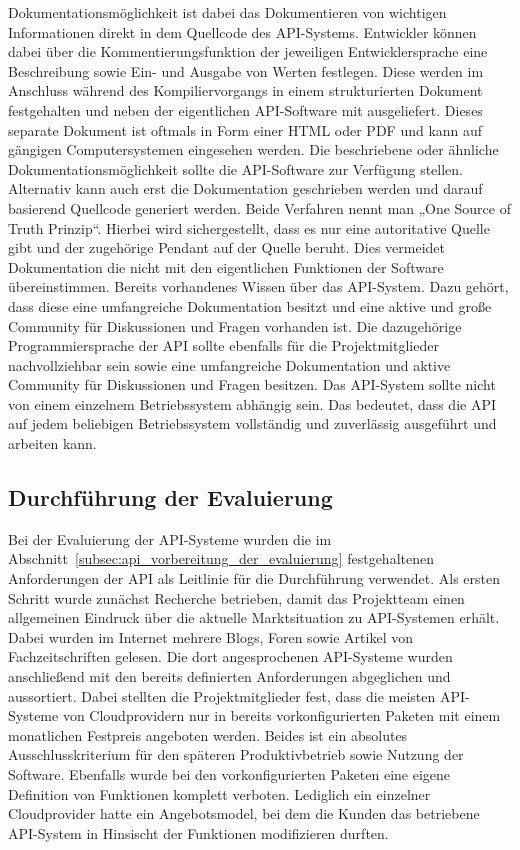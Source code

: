 \begin{outline}
  Dokumentationsmöglichkeit ist dabei das Dokumentieren von wichtigen
  Informationen direkt in dem Quellcode des \gls{API}\hyp{}Systems. Entwickler
  können dabei über die Kommentierungsfunktion der jeweiligen Entwicklersprache
  eine Beschreibung sowie Ein- und Ausgabe von Werten festlegen. Diese werden
  im Anschluss während des Kompiliervorgangs in einem strukturierten Dokument
  festgehalten und neben der eigentlichen \gls{API}\hyp{}Software mit
  ausgeliefert. Dieses separate Dokument ist oftmals in Form einer HTML oder
  PDF und kann auf gängigen Computersystemen eingesehen werden. Die
  beschriebene oder ähnliche Dokumentationsmöglichkeit sollte die
  \gls{API}\hyp{}Software zur Verfügung stellen. Alternativ kann auch erst die
  Dokumentation geschrieben werden und darauf basierend Quellcode generiert
  werden. Beide Verfahren nennt man „One Source of Truth Prinzip“. Hierbei wird
  sichergestellt, dass es nur eine autoritative Quelle gibt und der zugehörige
  Pendant auf der Quelle beruht. Dies vermeidet Dokumentation die nicht mit den
  eigentlichen Funktionen der Software übereinstimmen.
  \1 Bereits vorhandenes Wissen über das \gls{API}\hyp{}System. Dazu gehört,
  dass diese eine umfangreiche Dokumentation besitzt und eine aktive und große
  Community für Diskussionen und Fragen vorhanden ist. Die dazugehörige
  Programmiersprache der \gls{API} sollte ebenfalls für die Projektmitglieder
  nachvollziehbar sein sowie eine umfangreiche Dokumentation und aktive
  Community für Diskussionen und Fragen besitzen.
  \1 Das \gls{API}\hyp{}System sollte nicht von einem einzelnem Betriebssystem
  abhängig sein. Das bedeutet, dass die \gls{API} auf jedem beliebigen
  Betriebssystem vollständig und zuverlässig ausgeführt und arbeiten kann.
\end{outline}
\nl%

\subsection{Durchführung der Evaluierung}
\label{subsec:api_durchfuehrung_der_evaluierung}
Bei der Evaluierung der \gls{API}\hyp{}Systeme wurden die im
Abschnitt~\ref{subsec:api_vorbereitung_der_evaluierung} festgehaltenen
Anforderungen der \gls{API} als Leitlinie für die Durchführung verwendet. Als
ersten Schritt wurde zunächst Recherche betrieben, damit das Projektteam einen
allgemeinen Eindruck über die aktuelle Marktsituation zu \gls{API}\hyp{}Systemen
erhält. Dabei wurden im Internet mehrere Blogs, Foren sowie Artikel von
Fachzeitschriften gelesen. Die dort angesprochenen \gls{API}\hyp{}Systeme wurden
anschließend mit den bereits definierten Anforderungen abgeglichen und
aussortiert. Dabei stellten die Projektmitglieder fest, dass die meisten
\gls{API}\hyp{}Systeme von Cloudprovidern nur in bereits vorkonfigurierten
Paketen mit einem monatlichen Festpreis angeboten werden. Beides ist ein
absolutes Ausschlusskriterium für den späteren Produktivbetrieb sowie Nutzung
der Software. Ebenfalls wurde bei den vorkonfigurierten Paketen eine eigene
Definition von Funktionen komplett verboten. Lediglich ein einzelner
Cloudprovider hatte ein Angebotsmodel, bei dem die Kunden das betriebene
\gls{API}\hyp{}System in Hinsischt der Funktionen modifizieren durften.

